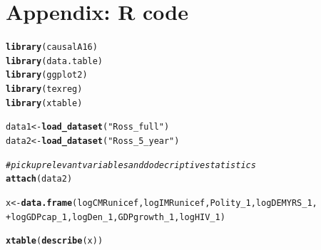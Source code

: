 \documentclass[12pt, lelterpaper, reqno]{article}\usepackage[]{graphicx}\usepackage[]{color}
\makeatletter
\newcommand{\hlstr}[1]{\textcolor[rgb]{0.192,0.494,0.8}{#1}}%
\newcommand{\hlcom}[1]{\textcolor[rgb]{0.678,0.584,0.686}{\textit{#1}}}%
\newcommand{\hlopt}[1]{\textcolor[rgb]{0,0,0}{#1}}%
\newcommand{\hlstd}[1]{\textcolor[rgb]{0.345,0.345,0.345}{#1}}%
\newcommand{\hlkwb}[1]{\textcolor[rgb]{0.69,0.353,0.396}{#1}}%
\newcommand{\hlkwd}[1]{\textcolor[rgb]{0.737,0.353,0.396}{\textbf{#1}}}%
\newenvironment{kframe}{%
 \def\at@end@of@kframe{}%
 \ifinner\ifhmode%
  \def\at@end@of@kframe{\end{minipage}}%
  \begin{minipage}{\columnwidth}%
 \fi\fi%
 \def\FrameCommand##1{\hskip\@totalleftmargin \hskip-\fboxsep
 \colorbox{shadecolor}{##1}\hskip-\fboxsep
     \hskip-\linewidth \hskip-\@totalleftmargin \hskip\columnwidth}%
 \MakeFramed {\advance\hsize-\width
   \@totalleftmargin\z@ \linewidth\hsize
   \@setminipage}}%
 {\par\unskip\endMakeFramed%
 \at@end@of@kframe}
\newenvironment{knitrout}{}{} %
\makeatother
\begin{document}
\section*{Appendix: R code}
\begin{tcolorbox}
\begin{knitrout}
\color{fgcolor}\begin{kframe}
\begin{alltt}
\hlkwd{library}\hlstd{(causalA16)}
\hlkwd{library}\hlstd{(data.table)}
\hlkwd{library}\hlstd{(ggplot2)}
\hlkwd{library}\hlstd{(texreg)}
\hlkwd{library}\hlstd{(xtable)}

\hlstd{data1} \hlkwb{<-} \hlkwd{load_dataset}\hlstd{(}\hlstr{"Ross_full"}\hlstd{)}
\hlstd{data2} \hlkwb{<-} \hlkwd{load_dataset}\hlstd{(}\hlstr{"Ross_5_year"}\hlstd{)}

\hlcom{# pick up relevant variables and do decriptive statistics}
\hlkwd{attach}\hlstd{(data2)}

\hlstd{x} \hlkwb{<-} \hlkwd{data.frame}\hlstd{(logCMRunicef,logIMRunicef,Polity_1,logDEMYRS_1,}
                \hlopt{+}\hlstd{logGDPcap_1,logDen_1,GDPgrowth_1,logHIV_1)}

\hlkwd{xtable}\hlstd{(}\hlkwd{describe}\hlstd{(x))}
\end{alltt}
\end{kframe}
\end{knitrout}

\end{tcolorbox}



\end{document}
